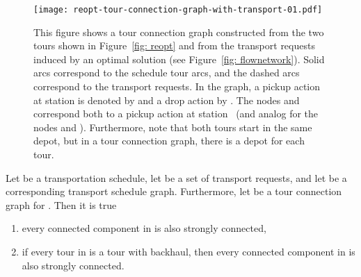 \documentclass[english]{llncs}
\numberwithin{sublemma}{lemma}
\begin{document}
\begin{figure}[ht]
    \centering
    \texttt{[image: reopt-tour-connection-graph-with-transport-01.pdf]}
 \caption{
  This figure shows a tour connection graph constructed from the two tours shown in Figure~\ref{fig: reopt} and from the transport requests induced by an optimal solution (see Figure~\ref{fig: flownetwork}).
  Solid arcs correspond to the schedule tour arcs, and the dashed arcs correspond to the transport requests.
  In the graph, a pickup action at station  is denoted by  and a drop action by .
  The nodes  and  correspond both to a pickup action at station~ (and analog for the nodes  and ).
  Furthermore, note that both tours start in the same depot, but in a tour connection graph, there is a depot for each tour.
 }
 \label{fig: static: reopt: multiple: tour connection graph}
\end{figure}






\begin{lemma}\label{lem: static: reopt: multiple: tour connection graph: connected thus strongly}
Let  be a transportation schedule,
let  be a set of transport requests, and let  be a corresponding transport schedule graph.
Furthermore, let  be a tour connection graph for .
Then it is true
\begin{enumerate}
 \item\label{lem: static: reopt: multiple: tour connection graph: connected thus strongly: 1} every connected component in  is also strongly connected,
 \item\label{lem: static: reopt: multiple: tour connection graph: connected thus strongly: 2} if every tour in  is a tour with backhaul, then every connected component in  is also strongly connected.
\end{enumerate}
\end{lemma}
\end{document}
